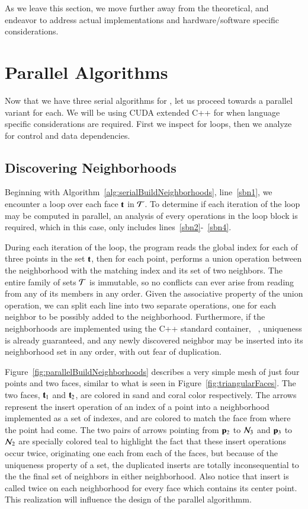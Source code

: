As we leave this section, we move further away from the theoretical, and endeavor to address actual implementations and hardware/software specific considerations.

%
%
%
%
%
\section{Parallel Algorithms}
\label{ch5sPA}
Now that we have three serial algorithms for , let us proceed towards a parallel variant for each. We will be using CUDA extended C++ for when language specific considerations are required. First we inspect for loops, then we analyze for control and data dependencies.

\subsection{Discovering Neighborhoods}
\label{ch5sPAssDN}
Beginning with Algorithm~\ref{alg:serialBuildNeighborhoods}, line~\ref{sbn1}, we encounter a loop over each face $\mathbf{t}$ in $\mathcal{T}$. To determine if each iteration of the loop may be computed in parallel, an analysis of every operations in the loop block is required, which in this case, only includes lines~\ref{sbn2}-~\ref{sbn4}.

During each iteration of the loop, the program reads the global index for each of three points in the set $\mathbf{t}$, then for each point, performs a union operation between the neighborhood with the matching index and its set of two neighbors. The entire family of sets $\mathcal{T}$ is immutable, so no conflicts can ever arise from reading from any of its members in any order. Given the associative property of the union operation, we can split each line into two separate operations, one for each neighbor to be possibly added to the neighborhood. Furthermore, if the neighborhoods are implemented using the C++ standard container, ~, uniqueness is already guaranteed, and any newly discovered neighbor may be inserted into its neighborhood set in any order, with out fear of duplication.

Figure~\ref{fig:parallelBuildNeighborhoods} describes a very simple mesh of just four points and two faces, similar to what is seen in Figure~\ref{fig:triangularFaces}. The two faces, $\mathbf{t}_1$ and $\mathbf{t}_2$, are colored in sand and coral color respectively. The arrows represent the insert operation of an index of a point into a neighborhood implemented as a set of indexes, and are colored to match the face from where the point had come. The two pairs of arrows pointing from $\mathbf{p}_2$ to $\mathcal{N}_3$ and $\mathbf{p}_3$ to $\mathcal{N}_2$ are specially colored teal to highlight the fact that these insert operations occur twice, originating one each from each of the faces, but because of the uniqueness property of a set, the duplicated inserts are totally inconsequential to the the final set of neighbors in either neighborhood. Also notice that insert is called twice on each neighborhood for every face which contains its center point. This realization will influence the design of the parallel algorithmm.

